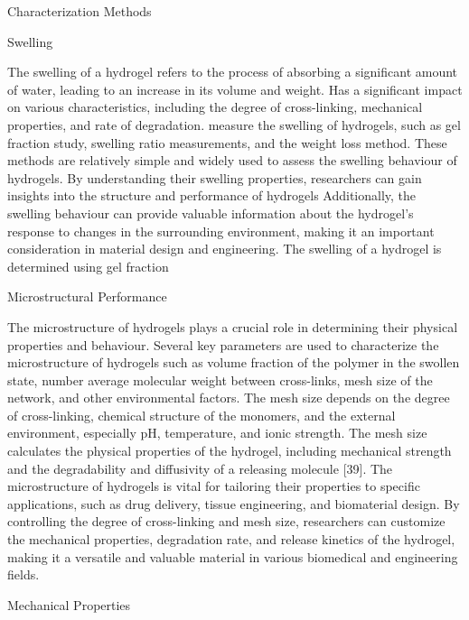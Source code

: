 \documentclass[../../main-notes.tex]{subfiles}
\begin{document}
Characterization Methods

Swelling

The swelling of a hydrogel refers to the process of absorbing a significant amount of water, leading to an increase in its volume and weight. 
Has a significant impact on various characteristics, including the degree of cross-linking, mechanical properties, and rate of degradation.
measure the swelling of hydrogels, such as gel fraction study, swelling ratio measurements, and the weight loss method. 
These methods are relatively simple and widely used to assess the swelling behaviour of hydrogels.
By understanding their swelling properties, researchers can gain insights into the structure and performance of hydrogels
Additionally, the swelling behaviour can provide valuable information about the hydrogel’s response to changes in the surrounding environment, making it an important consideration in material design and engineering. The swelling of a hydrogel is determined using gel fraction



Microstructural Performance 

The microstructure of hydrogels plays a crucial role in determining their physical properties and behaviour. 
Several key parameters are used to characterize the microstructure of hydrogels such as volume fraction of the polymer in the swollen state, number average molecular weight between cross-links, mesh size of the network, and other environmental factors. 
The mesh size depends on the degree of cross-linking, chemical structure of the monomers, and the external environment, especially pH, temperature, and ionic strength. 
The mesh size calculates the physical properties of the hydrogel, including mechanical strength and the degradability and diffusivity of a releasing molecule [39]. 
The microstructure of hydrogels is vital for tailoring their properties to specific applications, such as drug delivery, tissue engineering, and biomaterial design. 
By controlling the degree of cross-linking and mesh size, researchers can customize the mechanical properties, degradation rate, and release kinetics of the hydrogel, making it a versatile and valuable material in various biomedical and engineering fields. 




Mechanical Properties
\end{document}
